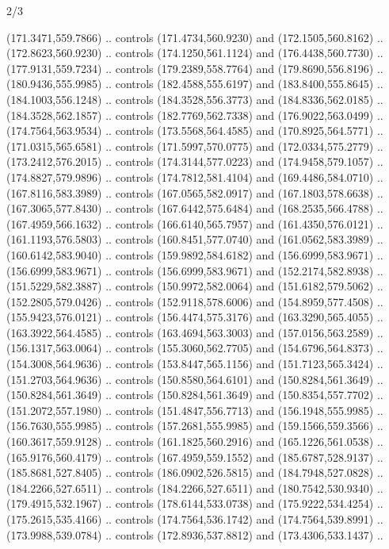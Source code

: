 \begin{flagdescription}{2/3}
\begin{scope}[shift={(0.5\flaglength,0.5)},scale=\flagwidth/545]
\begin{scope}[y=0.80pt, x=0.80pt, yscale=-1,shift={(-297,-430)}]
\begin{scope}[shift={(28.51887,-25.61095)}]
  (171.3471,559.7866) .. controls (171.4734,560.9230) and (172.1505,560.8162) ..
  (172.8623,560.9230) .. controls (174.1250,561.1124) and (176.4438,560.7730) ..
  (177.9131,559.7234) .. controls (179.2389,558.7764) and (179.8690,556.8196) ..
  (180.9436,555.9985) .. controls (182.4588,555.6197) and (183.8400,555.8645) ..
  (184.1003,556.1248) .. controls (184.3528,556.3773) and (184.8336,562.0185) ..
  (184.3528,562.1857) .. controls (182.7769,562.7338) and (176.9022,563.0499) ..
  (174.7564,563.9534) .. controls (173.5568,564.4585) and (170.8925,564.5771) ..
  (171.0315,565.6581) .. controls (171.5997,570.0775) and (172.0334,575.2779) ..
  (173.2412,576.2015) .. controls (174.3144,577.0223) and (174.9458,579.1057) ..
  (174.8827,579.9896) .. controls (174.7812,581.4104) and (169.4486,584.0710) ..
  (167.8116,583.3989) .. controls (167.0565,582.0917) and (167.1803,578.6638) ..
  (167.3065,577.8430) .. controls (167.6442,575.6484) and (168.2535,566.4788) ..
  (167.4959,566.1632) .. controls (166.6140,565.7957) and (161.4350,576.0121) ..
  (161.1193,576.5803) .. controls (160.8451,577.0740) and (161.0562,583.3989) ..
  (160.6142,583.9040) .. controls (159.9892,584.6182) and (156.6999,583.9671) ..
  (156.6999,583.9671) .. controls (156.6999,583.9671) and (152.2174,582.8938) ..
  (151.5229,582.3887) .. controls (150.9972,582.0064) and (151.6182,579.5062) ..
  (152.2805,579.0426) .. controls (152.9118,578.6006) and (154.8959,577.4508) ..
  (155.9423,576.0121) .. controls (156.4474,575.3176) and (163.3290,565.4055) ..
  (163.3922,564.4585) .. controls (163.4694,563.3003) and (157.0156,563.2589) ..
  (156.1317,563.0064) .. controls (155.3060,562.7705) and (154.6796,564.8373) ..
  (154.3008,564.9636) .. controls (153.8447,565.1156) and (151.7123,565.3424) ..
  (151.2703,564.9636) .. controls (150.8580,564.6101) and (150.8284,561.3649) ..
  (150.8284,561.3649) .. controls (150.8284,561.3649) and (150.8354,557.7702) ..
  (151.2072,557.1980) .. controls (151.4847,556.7713) and (156.1948,555.9985) ..
  (156.7630,555.9985) .. controls (157.2681,555.9985) and (159.1566,559.3566) ..
  (160.3617,559.9128) .. controls (161.1825,560.2916) and (165.1226,561.0538) ..
  (165.9176,560.4179) .. controls (167.4959,559.1552) and (185.6787,528.9137) ..
  (185.8681,527.8405) .. controls (186.0902,526.5815) and (184.7948,527.0828) ..
  (184.2266,527.6511) .. controls (184.2266,527.6511) and (180.7542,530.9340) ..
  (179.4915,532.1967) .. controls (178.6144,533.0738) and (175.9222,534.4254) ..
  (175.2615,535.4166) .. controls (174.7564,536.1742) and (174.7564,539.8991) ..
  (173.9988,539.0784) .. controls (172.8936,537.8812) and (173.4306,533.1437) ..

\end{scope}
\end{scope}
\end{scope}
\end{flagdescription}

